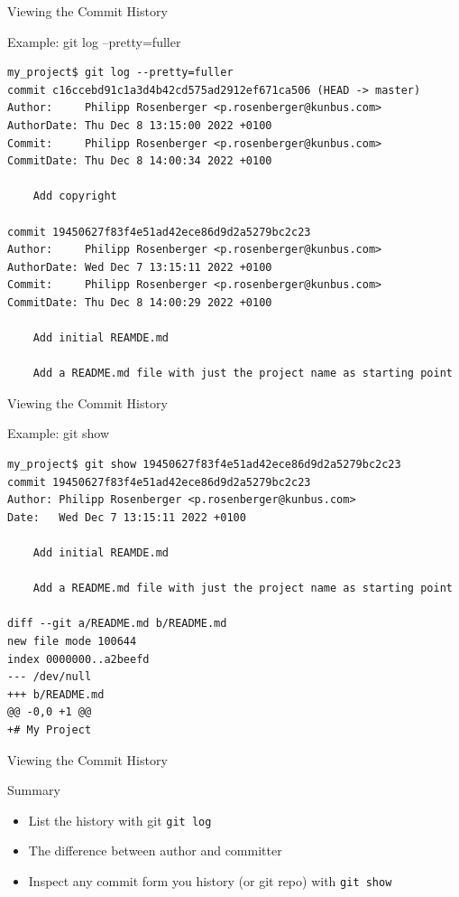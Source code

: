 \documentclass[aspectratio=169]{beamer}
\renewcommand{\footnotesize}{\tiny}
\newcommand{\sectiontitle}{}
\begin{document}
\begin{frame}[fragile]{Viewing the Commit History}{\sectiontitle}
\begin{block}{Example: \ttfamily git log --pretty=fuller}
\begin{verbatim}
my_project$ git log --pretty=fuller 
commit c16ccebd91c1a3d4b42cd575ad2912ef671ca506 (HEAD -> master)
Author:     Philipp Rosenberger <p.rosenberger@kunbus.com>
AuthorDate: Thu Dec 8 13:15:00 2022 +0100
Commit:     Philipp Rosenberger <p.rosenberger@kunbus.com>
CommitDate: Thu Dec 8 14:00:34 2022 +0100

    Add copyright

commit 19450627f83f4e51ad42ece86d9d2a5279bc2c23
Author:     Philipp Rosenberger <p.rosenberger@kunbus.com>
AuthorDate: Wed Dec 7 13:15:11 2022 +0100
Commit:     Philipp Rosenberger <p.rosenberger@kunbus.com>
CommitDate: Thu Dec 8 14:00:29 2022 +0100

    Add initial REAMDE.md
    
    Add a README.md file with just the project name as starting point
\end{verbatim}
\end{block}
\end{frame}

\begin{frame}[fragile]{Viewing the Commit History}{\sectiontitle}
\begin{block}{Example: \ttfamily git show}
\begin{verbatim}
my_project$ git show 19450627f83f4e51ad42ece86d9d2a5279bc2c23
commit 19450627f83f4e51ad42ece86d9d2a5279bc2c23
Author: Philipp Rosenberger <p.rosenberger@kunbus.com>
Date:   Wed Dec 7 13:15:11 2022 +0100

    Add initial REAMDE.md
    
    Add a README.md file with just the project name as starting point

diff --git a/README.md b/README.md
new file mode 100644
index 0000000..a2beefd
--- /dev/null
+++ b/README.md
@@ -0,0 +1 @@
+# My Project
\end{verbatim}
\end{block}
\end{frame}

\begin{frame}[fragile]{Viewing the Commit History}{\sectiontitle}
\begin{block}{Summary}
\begin{itemize}
    \item List the history with git \verb|git log|
    \item The difference between author and committer 
    \item Inspect any commit form you history (or git repo) with \verb|git show|
\end{itemize}
\end{block}
\end{frame}
\end{document}
